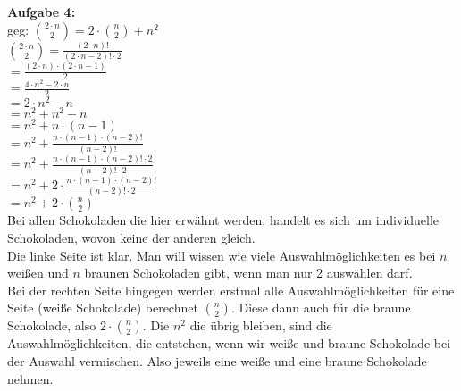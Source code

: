 \documentclass[a4paper]{scrartcl}
\begin{document}
	\begin{flushleft}
		\textbf{Aufgabe 4:}\\
		geg: $\binom{2\cdot n}{2}=2\cdot\binom{n}{2}+n^2$\\[1em]
		$\binom{2\cdot n}{2}=\frac{(2\cdot n)!}{(2\cdot n-2)!\cdot 2}$\\
		$=\frac{(2\cdot n)\cdot (2\cdot n-1)}{2}$\\
		$=\frac{4\cdot n^2 - 2\cdot n}{2}$\\
		$=2\cdot n^2 - n$\\
		$=n^2 + n^2 - n$\\
		$=n^2 + n\cdot(n-1)$\\
		$=n^2+\frac{n\cdot(n-1)\cdot (n-2)!}{(n-2)!}$\\
		$=n^2+\frac{n\cdot(n-1)\cdot (n-2)!\cdot 2}{(n-2)!\cdot 2}$\\
		$=n^2+2\cdot\frac{n\cdot(n-1)\cdot (n-2)!}{(n-2)!\cdot 2}$\\
		$=n^2+2\cdot\binom{n}{2}$\\[1em]
		Bei allen Schokoladen die hier erwähnt werden, handelt es sich um individuelle Schokoladen, wovon keine der anderen gleich.\\
		Die linke Seite ist klar. Man will wissen wie viele Auswahlmöglichkeiten es bei $n$ weißen und $n$ braunen Schokoladen gibt, wenn man nur 2 auswählen darf. \\[1em]
		Bei der rechten Seite hingegen werden erstmal alle Auswahlmöglichkeiten für eine Seite (weiße Schokolade) berechnet $\binom{n}{2}$. Diese dann auch für die braune Schokolade, also $2\cdot \binom{n}{2}$. Die $n^2$ die übrig bleiben, sind die Auswahlmöglichkeiten, die entstehen, wenn wir weiße und braune Schokolade bei der Auswahl vermischen. Also jeweils eine weiße und eine braune Schokolade nehmen.\\
	\end{flushleft}
\end{document}
